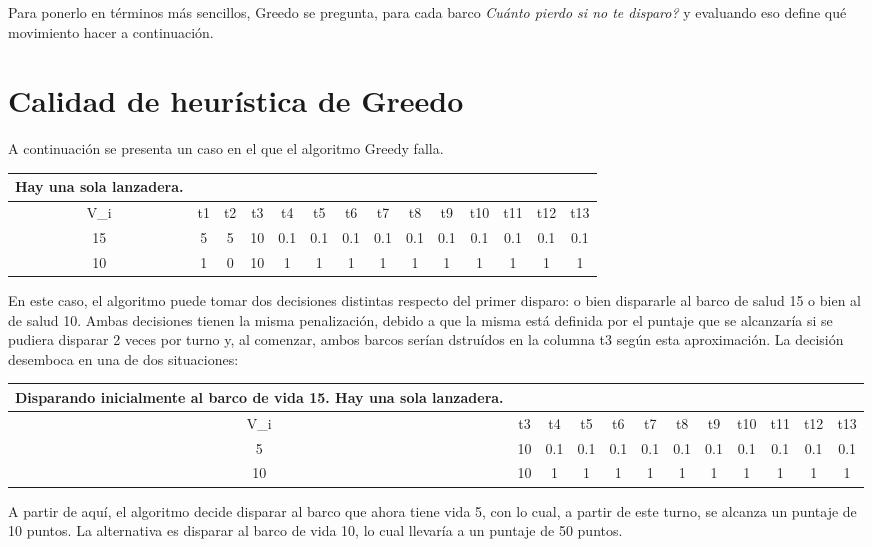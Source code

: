\documentclass{article}
\begin{document}
Para ponerlo en términos más sencillos, Greedo se pregunta, para cada barco \textit{Cuánto pierdo si no te disparo?} y evaluando eso define qué movimiento hacer a continuación.

\section{Calidad de heurística de Greedo}
A continuación se presenta un caso en el que el algoritmo Greedy falla.

\begin{center}
\begin{tabular}{ c | c c c c c c c c c c c c c}
Hay una sola lanzadera. \\
\hline
V_i & t1 & t2 & t3 & t4 & t5 & t6 & t7 & t8 & t9 & t10 & t11 & t12 & t13 \\
\hline
15    &  5 &  5 &  10 &  0.1 &  0.1 &  0.1 & 0.1 &  0.1 &  0.1 &  0.1 &  0.1 & 0.1  & 0.1 \\
10    &  1 &  0 &  10 &  1 &  1 &  1 & 1 &  1 &  1 &  1 &  1 & 1  & 1
\end{tabular}
\end{center}

En este caso, el algoritmo puede tomar dos decisiones distintas respecto del primer disparo: o bien dispararle al barco de salud 15 o bien al de salud 10. Ambas decisiones tienen la misma penalización, debido a que la misma está definida por el puntaje que se alcanzaría si se pudiera disparar 2 veces por turno y, al comenzar, ambos barcos serían dstruídos en la columna t3 según esta aproximación. La decisión desemboca en una de dos situaciones:

\begin{center}
\begin{tabular}{ c | c c c c c c c c c c c}
Disparando inicialmente al barco de vida 15. Hay una sola lanzadera. \\
\hline
V_i &   t3 & t4 & t5 & t6 & t7 & t8 & t9 & t10 & t11 & t12 & t13 \\
\hline
5     &  10 &  0.1 &  0.1 &  0.1 & 0.1 &  0.1 &  0.1 &  0.1 &  0.1 & 0.1  & 0.1 \\
10    &  10 &  1 &  1 &  1 & 1 &  1 &  1 &  1 &  1 & 1  & 1
\end{tabular}
\end{center}

A partir de aquí, el algoritmo decide disparar al barco que ahora tiene vida 5, con lo cual, a partir de este turno, se alcanza un puntaje de 10 puntos. La alternativa es disparar al barco de vida 10, lo cual llevaría a un puntaje de 50 puntos.
\end{document}
